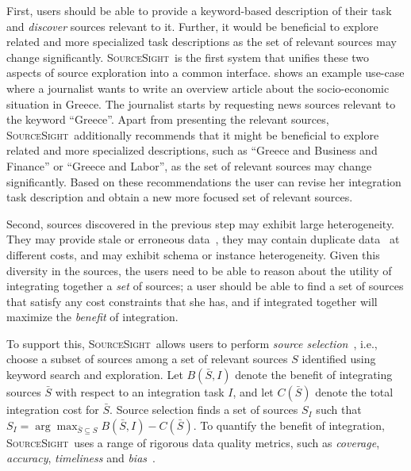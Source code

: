 \documentclass{sig-alternate-05-2015}
\newcommand\system{\textsc{SourceSight}}
\begin{document}
First, users should be able to provide a keyword-based description of their task and {\em discover} sources relevant to it. Further, it would be beneficial to explore related and more specialized task descriptions as the set of relevant sources may change significantly. \system~is the first system that unifies these two aspects of source exploration into a common interface.  shows an example use-case where a journalist wants to write an overview article about the socio-economic situation in Greece. The journalist starts by requesting news sources relevant to the keyword ``Greece''. Apart from presenting the relevant sources, \system~additionally recommends that it might be beneficial to explore related and more specialized descriptions, such as ``Greece and Business and Finance'' or ``Greece and Labor'', as the set of relevant sources may change significantly. Based on these recommendations the user can revise her integration task description and obtain a new more focused set of relevant sources.

Second, sources discovered in the previous step may exhibit large heterogeneity. They may provide stale or erroneous data~\cite{Dong_vldb:2009, li:2012}, they may contain duplicate data~\cite{bronzi:2013, li:2012} at different costs, and may exhibit schema or instance heterogeneity. Given this diversity in the sources, the users need to be able to reason about the utility of integrating together a {\em set} of sources; a user should be able to find a set of sources that satisfy any cost constraints that she has, and if integrated together will maximize the {\em benefit} of integration. 

To support this, \system~allows users to perform {\em source selection}~\cite{dong:vldb13}, i.e., choose a subset of sources among a set of relevant sources $S$ identified using keyword search and exploration. Let $B(\bar{S},I)$ denote the benefit of integrating sources $\bar{S}$ with respect to an integration task $I$, and let $C(\bar{S})$ denote the total integration cost for $\bar{S}$. Source selection finds a set of sources $S_I$ such that $S_I = \arg\max_{\bar{S} \subseteq S}B(\bar{S},I) - C(\bar{S})$. To quantify the benefit of integration, \system~uses a range of rigorous data quality metrics, such as {\em coverage}, {\em accuracy}, {\em timeliness} and {\em bias}~\cite{rekatsinas:2015}. 
\end{document}
